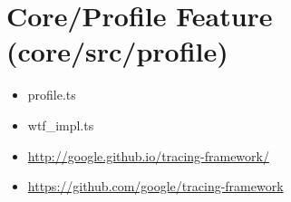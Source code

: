 \section{Core/Profile Feature (core/src/profile)}


\begin{itemize}
  \item profile.ts
  \item wtf\_impl.ts
\end{itemize}


\begin{itemize}
  \item \url{http://google.github.io/tracing-framework/}
\end{itemize}



\begin{itemize}
  \item \url{https://github.com/google/tracing-framework}
\end{itemize}
















